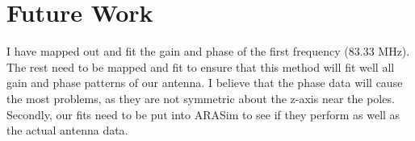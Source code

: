 \documentclass[11pt]{article} %
\begin{document}
\section{Future Work}

I have mapped out and fit the gain and phase of the first frequency (83.33 MHz). The rest need to be mapped and fit to ensure that this method will fit well all gain and phase patterns of our antenna. I believe that the phase data will cause the most problems, as they are not symmetric about the z-axis near the poles. Secondly, our fits need to be put into ARASim to see if they perform as well as the actual antenna data.
\end{document}
